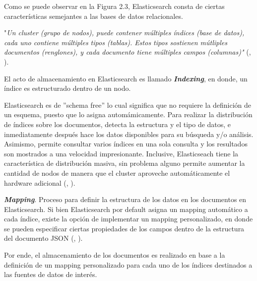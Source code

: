 Como se puede observar en la Figura 2.3, Elasticsearch consta de ciertas características semejantes a las bases de datos relacionales. 

"\textit{Un cluster (grupo de nodos), puede contener múltiples índices (base de datos), cada uno contiene múltiples tipos (tablas). Estos tipos sostienen mútliples documentos (renglones), y cada documento tiene múltiples campos (columnas)"} (\citeauthor{Gormley}, \citeyear{Gormley}).

El acto de almacenamiento en Elasticsearch es llamado \textit{\textbf{Indexing}}, en donde, un índice es estructurado dentro de un nodo.  

Elasticsearch es de ''schema free'' lo cual significa que no requiere la definici\'on de un esquema, puesto que lo asigna autom\'amicamente. Para realizar la distribución de índices sobre los documentos, detecta la estructura y el tipo de datos,  e inmediatamente después hace los datos disponibles para su búsqueda y/o análisis. Asimismo, permite consultar varios índices en una sola consulta y los resultados son mostrados a una velocidad impresionante. Inclusive, Elasticseach tiene la característica de distribución masiva, sin problema alguno permite aumentar la cantidad de nodos de manera que el cluster aproveche automáticamente el hardware adicional (\citeauthor{siteElastic}, \citeyear{siteElastic}).

\textbf{\textit{Mapping}}. Proceso para definir la estructura de los datos en los documentos en Elasticsearch. Si bien Elasticsearch por default asigna un mapping automático a cada índice, existe la opción de implementar un mapping personalizado, en donde se pueden especificar ciertas propiedades de los campos dentro de la estructura del documento JSON (\citeauthor{Gormley}, \citeyear{Gormley}). 

Por ende, el almacenamiento de los documentos es realizado en base a la definición de un mapping personalizado para cada uno de los índices destinados a las fuentes de datos de interés. 





